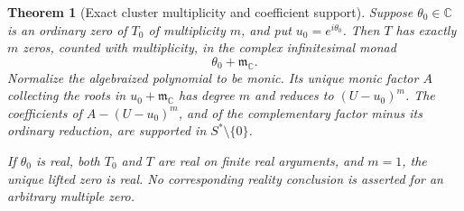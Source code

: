 \documentclass[11pt]{article}
\numberwithin{equation}{section}
\newtheorem{theorem}{Theorem}[section]
\theoremstyle{definition}
\newcommand{\C}{\mathbb C}
\newcommand{\mm}{\mathfrak m}
\begin{document}
\begin{theorem}[Exact cluster multiplicity and coefficient support]\label{thm:cluster}
Suppose $\theta_0\in\C$ is an ordinary zero of $T_0$ of multiplicity $m$, and put $u_0=e^{i\theta_0}$. Then $T$ has exactly $m$ zeros, counted with multiplicity, in the complex infinitesimal monad
\[
 \theta_0+\mm_{\C}.
\]
Normalize the algebraized polynomial to be monic. Its unique monic factor $A$ collecting the roots in $u_0+\mm_{\C}$ has degree $m$ and reduces to $(U-u_0)^m$. The coefficients of $A-(U-u_0)^m$, and of the complementary factor minus its ordinary reduction, are supported in $S^*\setminus\{0\}$.

If $\theta_0$ is real, both $T_0$ and $T$ are real on finite real arguments, and $m=1$, the unique lifted zero is real. No corresponding reality conclusion is asserted for an arbitrary multiple zero.
\end{theorem}
\end{document}

